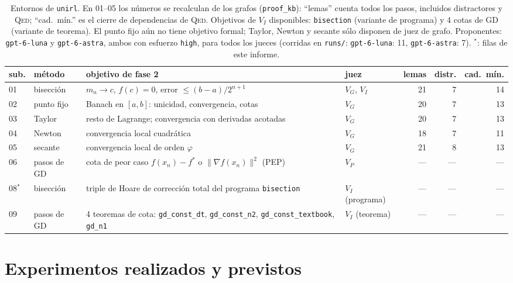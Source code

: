 \documentclass[11pt,a4paper]{article}
\begin{document}
\begin{table}[!ht]
\centering
\footnotesize
\begin{tabular}{@{}llp{5.0cm}lrrr@{}}
\toprule
sub. & método & objetivo de fase 2 & juez & lemas & distr. & cad.\ mín. \\
\midrule
01 & bisección & $m_n \to c$, $f(c)=0$, error $\le (b-a)/2^{n+1}$ & $V_G$, $V_I$ & 21 & 7 & 14 \\
02 & punto fijo & Banach en $[a,b]$: unicidad, convergencia, cotas & $V_G$ & 20 & 7 & 13 \\
03 & Taylor & resto de Lagrange; convergencia con derivadas acotadas & $V_G$ & 20 & 7 & 13 \\
04 & Newton & convergencia local cuadrática & $V_G$ & 18 & 7 & 11 \\
05 & secante & convergencia local de orden $\varphi$ & $V_G$ & 21 & 8 & 13 \\
06 & pasos de GD & cota de peor caso $f(x_n)-f^*$ o $\|\nabla f(x_n)\|^2$ (PEP) & $V_P$ & --- & --- & --- \\
08$^\ast$ & bisección & triple de Hoare de corrección total del programa \texttt{bisection} & $V_I$ (programa) & --- & --- & --- \\
09 & pasos de GD & 4 teoremas de cota: \texttt{gd\_\allowbreak{}const\_\allowbreak{}dt}, \texttt{gd\_\allowbreak{}const\_\allowbreak{}n2}, \texttt{gd\_\allowbreak{}const\_\allowbreak{}textbook}, \texttt{gd\_\allowbreak{}n1} & $V_I$ (teorema) & --- & --- & --- \\
\bottomrule
\end{tabular}
\caption{Entornos de \texttt{unirl}. En 01--05 los números se recalculan de los grafos (\texttt{proof\_kb}): ``lemas'' cuenta todos los pasos, incluidos distractores y \textsc{Qed}; ``cad.\ mín.'' es el cierre de dependencias de \textsc{Qed}. Objetivos de $V_I$ disponibles: \texttt{bisection} (variante de programa) y 4 cotas de GD (variante de teorema). El punto fijo aún no tiene objetivo formal; Taylor, Newton y secante sólo disponen de juez de grafo. Proponentes: \texttt{gpt-6-luna} y \texttt{gpt-6-astra}, ambos con esfuerzo \texttt{high}, para todos los jueces (corridas en \texttt{runs/}: \texttt{gpt-\allowbreak{}6-\allowbreak{}luna}: 11, \texttt{gpt-\allowbreak{}6-\allowbreak{}astra}: 7). $^\ast$: filas de este informe.}
\label{tab:envs}
\end{table}

\section{Experimentos realizados y previstos}
\end{document}
